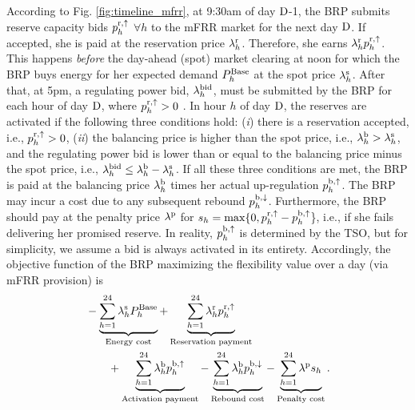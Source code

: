 \documentclass[11pt,a4paper]{article}
\begin{document}
According to Fig. \ref{fig:timeline_mfrr}, at 9:30am of day $\rm{D}$-1, the BRP submits reserve capacity bids $p_{h}^{\rm{r},\uparrow}$ $\forall{h}$ to the mFRR market for the next day $\rm{D}$. If accepted, she is paid at the reservation price $\lambda_{h}^{\rm{r}}$. Therefore, she earns $\lambda_{h}^{\rm{r}}p_{h}^{\rm{r},\uparrow}$. This happens \textit{before} the day-ahead (spot) market clearing at noon for which the BRP buys energy for her expected demand $P_{h}^{\rm{Base}}$ at the spot price $\lambda_{h}^{\rm{s}}$. After that, at 5pm, a regulating power bid, $\lambda_{h}^{\rm{bid}}$, must be submitted by the BRP for each hour of day $\rm{D}$, where $p_{h}^{\rm{r},\uparrow} > 0$ \cite{energinet:Systemydelser}. In hour $h$ of day $\rm{D}$, the reserves are activated if the following three conditions hold: (\textit{i}) there is a reservation accepted, i.e., $p_{h}^{\rm{r},\uparrow} > 0$, (\textit{ii}) the balancing price is higher than the spot price, i.e., $\lambda_{h}^{\rm{b}} > \lambda_{h}^{\rm{s}}$, and the regulating power bid is lower than or equal to the balancing price minus the spot price, i.e., $\lambda_{h}^{\rm{bid}} \leq  \lambda_{h}^{\rm{b}} - \lambda_{h}^{\rm{s}}$. If all these three conditions are met, the BRP is paid at the balancing price $\lambda_{h}^{\rm{b}}$ times her actual up-regulation $p_{h}^{\rm{b},\uparrow}$. The BRP may  incur a cost due to any subsequent rebound $p_{h}^{\rm{b},\downarrow}$. Furthermore, the BRP should pay at the penalty price $\lambda^{\rm{p}}$ for $s_{h} = \text{max}\{0, p_{h}^{\rm{r},\uparrow} - p_{h}^{\rm{b},\uparrow}$\}, i.e., if she fails delivering her promised reserve. In reality, $p_{h}^{\rm{b},\uparrow}$ is determined by the TSO, but for simplicity, we assume a bid is always activated in its entirety.
Accordingly, the objective function of the BRP maximizing the flexibility value over a day (via mFRR provision) is
%
\begin{align}\label{eq:mFRRObjective}
     & - \underbrace{\sum_{h=1}^{24} \lambda^{\rm{s}}_{h}P^{\rm{Base}}_{h}}_{\textrm{Energy cost}} + \underbrace{\sum_{h=1}^{24}\lambda_{h}^{\rm{r}} p^{\rm{r}, \uparrow}_{h}}_{\textrm{Reservation payment}}  \notag \\ & \quad \quad + \underbrace{\sum_{h=1}^{24}  \lambda_{h}^{\rm{b}} p^{\rm{b},\uparrow}_{h}}_{\textrm{Activation payment}} - \underbrace{\sum_{h=1}^{24}  \lambda_{h}^{\rm{b}} p^{\rm{b},\downarrow}_{h}}_{\textrm{Rebound cost}} - \underbrace{ \sum_{h=1}^{24}  \lambda^{\rm{p}}s_{h}}_{\textrm{Penalty cost}}.
\end{align}
\end{document}
